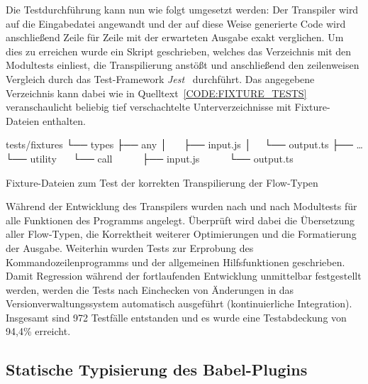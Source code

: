 Die Testdurchführung kann nun wie folgt umgesetzt werden: Der Transpiler wird auf die Eingabedatei angewandt und der auf diese Weise generierte Code wird anschließend Zeile für Zeile mit der erwarteten Ausgabe exakt verglichen. Um dies zu erreichen wurde ein Skript geschrieben, welches das Verzeichnis mit den Modultests einliest, die Transpilierung anstößt und anschließend den zeilenweisen Vergleich durch das Test-Framework \textit{Jest}~\autocite{SOFTWARE:JEST} durchführt. Das angegebene Verzeichnis kann dabei wie in Quelltext~\ref{CODE:FIXTURE_TESTS} veranschaulicht beliebig tief verschachtelte Unterverzeichnisse mit Fixture-Dateien enthalten.

\bigskip
\begin{listing}[htbp]
  \begin{textcode}
  tests/fixtures
  └── types
      ├── any
      │     ├── input.js
      │     └── output.ts
      ├── …
      └── utility
          └── call
              ├── input.js
              └── output.ts
  \end{textcode}
  \caption{Fixture-Dateien zum Test der korrekten Transpilierung der Flow-Typen}
  \captionsetup{justification=raggedright,singlelinecheck=false}
  \label{CODE:FIXTURE_TESTS}
\end{listing}

Während der Entwicklung des Transpilers wurden nach und nach Modultests für alle Funktionen des Programms angelegt. Überprüft wird dabei die Übersetzung aller Flow-Typen, die Korrektheit weiterer Optimierungen und die Formatierung der Ausgabe. Weiterhin wurden Tests zur Erprobung des Kommandozeilenprogramms und der allgemeinen Hilfsfunktionen geschrieben. Damit Regression während der fortlaufenden Entwicklung unmittelbar festgestellt werden, werden die Tests nach Einchecken von Änderungen in das Versionverwaltungssystem automatisch ausgeführt (kontinuierliche Integration). Insgesamt sind 972 Testfälle entstanden und es wurde eine Testabdeckung von 94,4\% erreicht.

\subsection{Statische Typisierung des Babel-Plugins}


